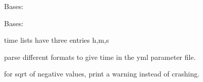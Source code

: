 \documentclass[letterpaper,10pt,english]{sphinxmanual}
\begin{document}
\begin{fulllineitems}
\label{\detokenize{helpers:helpers.tools.Empty}}
Bases: 

\end{fulllineitems}


\begin{fulllineitems}
\label{\detokenize{helpers:helpers.tools.InputPrmError}}
Bases: 

\end{fulllineitems}


\begin{fulllineitems}
\label{\detokenize{helpers:helpers.tools.isvalidlist}}
time lists have three entries h,m,s

\end{fulllineitems}


\begin{fulllineitems}
\label{\detokenize{helpers:helpers.tools.parse_time_to_seconds}}
parse different formats to give time in the yml parameter file.

\end{fulllineitems}


\begin{fulllineitems}
\label{\detokenize{helpers:helpers.tools.safe_sqrt}}
for sqrt of negative values, print a warning instead of crashing.

\end{fulllineitems}
\end{document}
